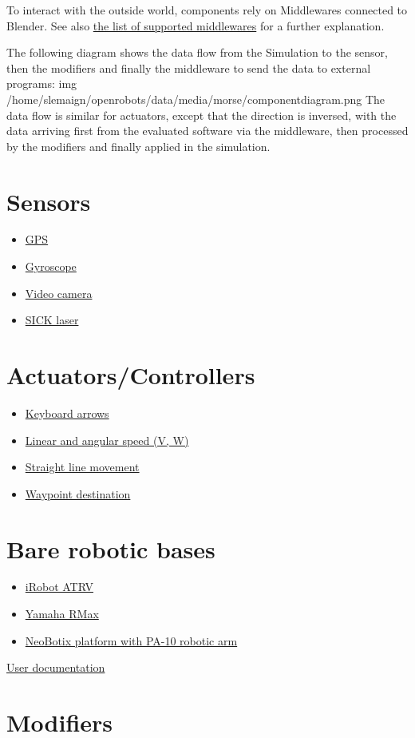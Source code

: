 \documentclass[twoside,a4paper,10pt]{report}
\newcommand{\dokutitleleveltwo}[1]{\section{#1}}
\newcommand{\dokuitem}{\item}
\newcommand{\dokuquoting}{\textbar}
\begin{document}
To interact with the outside world, components rely on Middlewares connected to Blender. See also \hyperref[9a05db9c4b60b0527010fd997682f523]{ the list of supported middlewares} for a further explanation.

The following diagram shows the data flow from the Simulation to the sensor, then the modifiers and finally the middleware to send the data to external programs:
img /home/slemaign/openrobots/data/media/morse/component{\textunderscore}diagram.png
The data flow is similar for actuators, except that the direction is inversed, with the data arriving first from the evaluated software via the middleware, then processed by the modifiers and finally applied in the simulation.


\dokutitleleveltwo{Sensors}
\label{029aee483db9ae244d7a5cb353e74602}%

\begin{itemize}
\dokuitem  \hyperref[11648e4e66e7ed6a86cb7f1d0cf604fe]{ GPS}
\dokuitem  \hyperref[6b3b2d8500522343e080755f0e0aa4fe]{ Gyroscope}
\dokuitem  \hyperref[dd6d2dcc679d12b9430a9787bab45b33]{ Video camera}
\dokuitem  \hyperref[8d7d5ffd0031f2449cbeaef424c22d75]{ SICK laser}
\end{itemize}

\dokutitleleveltwo{Actuators/Controllers}
\label{2068e59180763f350d66a42e828e7f96}%

\begin{itemize}
\dokuitem  \hyperref[388a56dbb62a010dc26a378981346247]{ Keyboard arrows}
\dokuitem  \hyperref[cdf7afd8bc8dbb764b14c987cea8effd]{ Linear and angular speed (V, W)}
\dokuitem  \hyperref[6990a54322d9232390a784c5c9247dd6]{ Straight line movement}
\dokuitem  \hyperref[f75862c2bd0040eb683048c313dcaaa8]{ Waypoint destination}
\end{itemize}

\dokutitleleveltwo{Bare robotic bases}
\label{d69ac14cd721dd995822d4e984f48116}%

\begin{itemize}
\dokuitem  \hyperref[4fd87f5742582d412dce2c6ad5304937]{ iRobot ATRV}
\dokuitem  \hyperref[311954cf2f831f2289fb7fff75d15a7d]{ Yamaha RMax}
\dokuitem  \hyperref[3c16132d99703978dacd02b0808a4270]{ NeoBotix platform with PA-10 robotic arm}
\end{itemize}
{\dokuquoting}{\dokuquoting} \hyperref[a80da1282f2c775bbc5f2c92c836968b]{ User documentation}


\dokutitleleveltwo{Modifiers}
\label{bf24b44a8cc99e648657b164c8aba758}%
\label{25bc6523e9298f4691b3c8200a395d92}%
\end{document}
